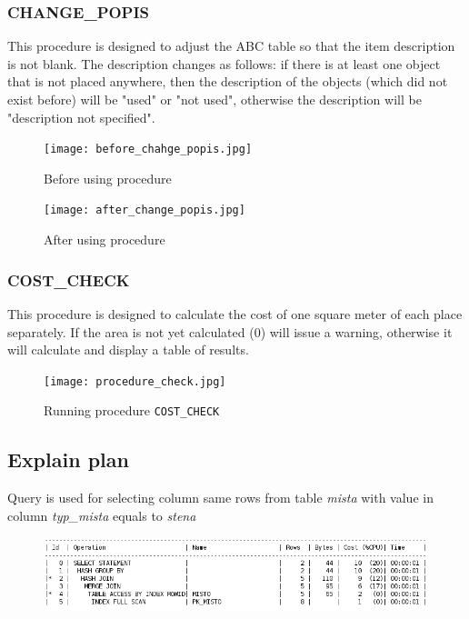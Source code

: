 \documentclass[12pt,a4paper]{article}
\begin{document}
\subsubsection{CHANGE\_POPIS}

This procedure is designed to adjust the ABC table so that the item description 
is not blank. The description changes as follows: if there is at least one 
object that is not placed anywhere, then the description of the objects (which 
did not exist before) will be "used" or "not used", otherwise the description 
will be "description not specified".

\begin{figure}[h!]
    \centering
    \texttt{[image: before\_chahge\_popis.jpg]}
    \caption{Before using procedure}

    \texttt{[image: after\_change\_popis.jpg]}
    \caption{After using procedure}
\end{figure}
\newpage
\subsubsection{COST\_CHECK}

This procedure is designed to calculate the cost of one square meter of each 
place separately. If the area is not yet calculated (0) will issue a warning, 
otherwise it will calculate and display a table of results.
\begin{figure}[h!]
    \centering
    \texttt{[image: procedure\_check.jpg]}
    \caption{Running procedure \texttt{COST\_CHECK}}
\end{figure}

\subsection{Explain plan}

Query is used for selecting column same rows from table \textit{mista} with value 
in column \textit{typ\_mista} equals to \textit{stena}

\begin{figure}[h!]
    \centering
    \includegraphics[width=\textwidth,height=\textheight,keepaspectratio]
    {prev_explain_plan.png}
\end{figure}
\end{document}
